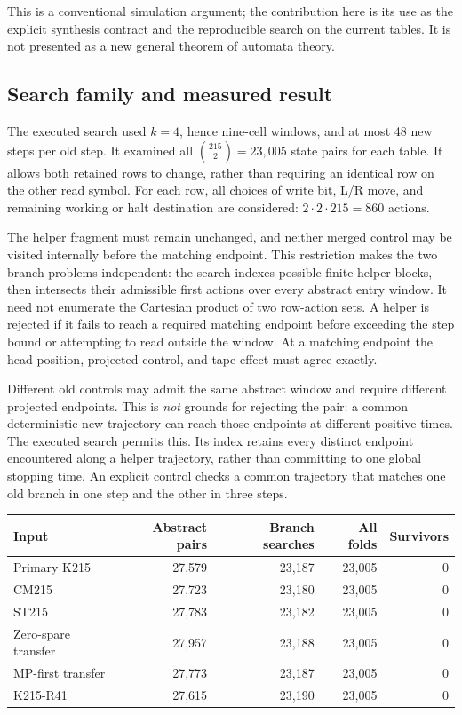 This is a conventional simulation argument; the contribution here is its
use as the explicit synthesis contract and the reproducible search on the
current tables.  It is not presented as a new general theorem of automata
theory.

\subsection{Search family and measured result}

The executed search used $k=4$, hence nine-cell windows, and at most 48
new steps per old step.  It examined all $\binom{215}{2}=23{,}005$ state
pairs for each table.  It allows both retained rows to change, rather than
requiring an identical row on the other read symbol.  For each row, all
choices of write bit, L/R move, and remaining working or halt destination
are considered: $2\cdot2\cdot215=860$ actions.

The helper fragment must remain unchanged, and neither merged control may
be visited internally before the matching endpoint.  This restriction makes
the two branch problems independent: the search indexes possible finite
helper blocks, then intersects their admissible first actions over every
abstract entry window.  It need not enumerate the Cartesian product of two
row-action sets.  A helper is rejected if it fails to reach a required
matching endpoint before exceeding the step bound or attempting to read
outside the window.  At a matching endpoint the head position, projected
control, and tape effect must agree exactly.

Different old controls may admit the same abstract window and require
different projected endpoints.  This is \emph{not} grounds for rejecting the
pair: a common deterministic new trajectory can reach those endpoints at
different positive times.  The executed search permits this.  Its index
retains every distinct endpoint encountered along a helper trajectory,
rather than committing to one global stopping time.  An explicit control
checks a common trajectory that matches one old branch in one step and the
other in three steps.

\begin{center}
\begin{tabular}{lrrrr}
\hline
Input & Abstract pairs & Branch searches & All folds & Survivors\\
\hline
Primary K215 & 27,579 & 23,187 & 23,005 & 0\\
CM215 & 27,723 & 23,180 & 23,005 & 0\\
ST215 & 27,783 & 23,182 & 23,005 & 0\\
Zero-spare transfer & 27,957 & 23,188 & 23,005 & 0\\
MP-first transfer & 27,773 & 23,187 & 23,005 & 0\\
K215-R41 & 27,615 & 23,190 & 23,005 & 0\\
\hline
\end{tabular}
\end{center}

